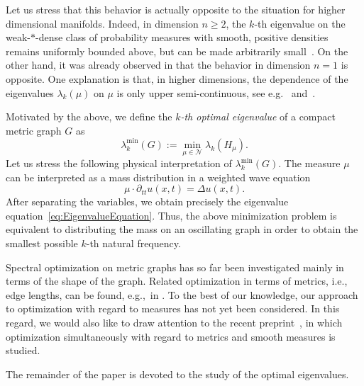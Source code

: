 \documentclass[reqno]{amsart}
\theoremstyle{plain}
\theoremstyle{definition}
\theoremstyle{remark}
\numberwithin{equation}{section}
\newcommand{\cN}{\mathcal{N}}
\begin{document}
	
Let us stress that this behavior is actually opposite to the situation for higher dimensional manifolds. Indeed, in dimension $n \ge 2$, the $k$-th eigenvalue on the weak-$\ast$-dense class of probability measures with smooth, positive densities remains uniformly bounded above, but can be made arbitrarily small~\cite{ce19, ces15, gny}. On the other hand, it was already observed in \cite{cp18} that the behavior in dimension $n=1$ is opposite. One explanation is that, in higher dimensions, the dependence of the eigenvalues $\lambda_k(\mu)$ on $\mu$ is only upper semi-continuous, see e.g.~\cite[Proposition 1.1]{kokarev} and~\cite[Proposition 4.1]{gkl}.

	\smallskip


Motivated by the above, we define the {\em $k$-th optimal eigenvalue} of a compact metric graph $G$ as
\[
\lambda_k^{\min}(G) := \min_{\mu \in \cN} \lambda_k(H_\mu).
\]
Let us stress the following physical interpretation of $\lambda_k^{\min}(G)$. The measure $\mu$ can be interpreted as a mass distribution in a weighted wave equation
\[
	\mu \cdot \partial_{tt}u(x,t) = \Delta u(x,t).
\]
After separating the variables, we obtain precisely the eigenvalue equation~\eqref{eq:EigenvalueEquation}. Thus, the above minimization problem is equivalent to distributing the mass on an oscillating graph in order to obtain the smallest possible $k$-th natural frequency.

Spectral optimization on metric graphs has so far been investigated mainly in terms of the shape of the graph. Related optimization in terms of metrics, i.e., edge lengths, can be found, e.g.,~in \cite{Band}. To the best of our knowledge, our approach to optimization with regard to measures has not yet been considered. In this regard, we would also like to draw attention to the recent preprint~\cite{Cao}, in which optimization simultaneously with regard to metrics and smooth measures is studied.


The remainder of the paper is devoted to the study of the optimal eigenvalues.
\end{document}

